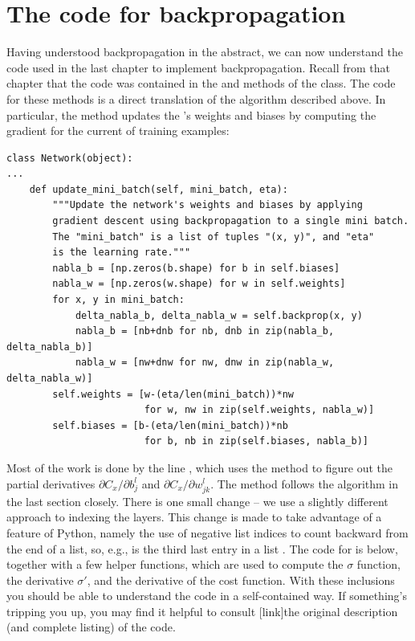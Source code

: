 \documentclass[a4paper,twoside,10pt]{book}
\begin{document}
\section{The code for backpropagation}
\label{sec:2.7}
Having understood backpropagation in the abstract, we can now understand the code used in the last chapter to implement backpropagation. Recall from that chapter that the code was contained in the  and  methods of the  class. The code for these methods is a direct translation of the algorithm described above. In particular, the   method updates the 's weights and biases by computing the gradient for the current  of training examples:
\begin{lstlisting}
class Network(object):
...
	def update_mini_batch(self, mini_batch, eta):
		"""Update the network's weights and biases by applying
		gradient descent using backpropagation to a single mini batch.
		The "mini_batch" is a list of tuples "(x, y)", and "eta"
		is the learning rate."""
		nabla_b = [np.zeros(b.shape) for b in self.biases]
		nabla_w = [np.zeros(w.shape) for w in self.weights]
		for x, y in mini_batch:
			delta_nabla_b, delta_nabla_w = self.backprop(x, y)
			nabla_b = [nb+dnb for nb, dnb in zip(nabla_b, delta_nabla_b)]
			nabla_w = [nw+dnw for nw, dnw in zip(nabla_w, delta_nabla_w)]
		self.weights = [w-(eta/len(mini_batch))*nw 
						for w, nw in zip(self.weights, nabla_w)]
		self.biases = [b-(eta/len(mini_batch))*nb 
						for b, nb in zip(self.biases, nabla_b)]

\end{lstlisting}
Most of the work is done by the line ,  which uses the  method to figure out the partial derivatives $\partial{}C_x/\partial{}b^l_j$ and $\partial{}C_x/\partial{}w^l_{jk}$. The  method follows the algorithm in the last section closely. There is one small change -- we use a slightly different approach to indexing the layers. This change is made to take advantage of a feature of Python, namely the use of negative list indices to count backward from the end of a list, so, e.g.,  is the third last entry in a list . The code for  is below, together with a few helper functions, which are used to compute the $\sigma$ function, the derivative $\sigma'$, and the derivative of the cost function. With these inclusions you should be able to understand the code in a self-contained way. If something's tripping you up, you may find it helpful to consult [link]the original description (and complete listing) of the code.
\end{document}
